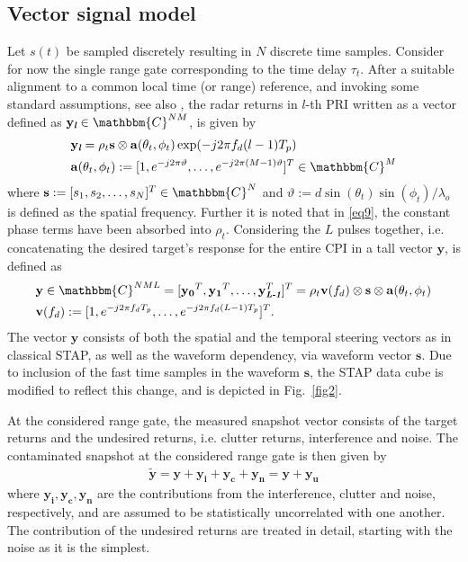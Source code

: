 \documentclass[11pt,draftclsnofoot,onecolumn]{IEEEtran}
\def\mathbi#1{\textbf{\em #1}}
\theoremstyle{definition}
\theoremstyle{remark}
\begin{document}
\subsection{Vector signal model}
Let $s(t)$ be sampled discretely resulting in $N$ discrete time samples. Consider for now the single range gate corresponding to the time delay $\tau_t$. After a suitable alignment to a common local time (or range) reference,  and invoking some standard assumptions, see also \cite[{\it A.1-A.3}] {Setlurradar2013}, the radar returns in $l$-th PRI  written as a vector defined as $\mathbf{y}_{\mathbi{l}}\in\mathbbm{C}^{NM}$, is given by
\begin{align}
&\mathbf{y}_{\mathbi{l}}=\rho_t\mathbf{s}\otimes \mathbf{a}(\theta_t,\phi_t)\exp(-j2\pi f_d(l-1)T_p) \label{eq9} \\
&\mathbf{a}(\theta_t,\phi_t):=[1,e^{-j2\pi\vartheta},\ldots,e^{-j2\pi (M-1)\vartheta}]^T \in\mathbbm{C}^M \nonumber
\end{align}
where $\mathbf{s}:=[s_1,s_2,\ldots,s_N]^T \in\mathbbm{C}^N  $ and $\vartheta:=d\sin(\theta_t)\sin(\phi_t)/\lambda_o$ is defined as the spatial frequency. Further it is noted that in \eqref{eq9}, the constant phase terms have been absorbed into $\rho_t$. Considering the $L$ pulses together, i.e. concatenating the desired target's response for the entire CPI in a tall vector $\mathbf{y}$, is defined as
\begin{align}
&\mathbf{y}\in\mathbbm{C}^{NML}=[\mathbf{y_0}^T,\mathbf{y_1}^T,\ldots,\mathbf{y}_{\mathbi{L-1}}^T]^T =\rho_t \mathbf{v}(f_d) \otimes\mathbf{s}\otimes \mathbf{a}(\theta_t,\phi_t)\nonumber \\
&\mathbf{v}(f_d):=[1,e^{-j2\pi f_dT_p},\ldots,e^{-j2\pi f_d(L-1)T_p}]^T \label{eq10}.
\end{align}
The vector $\mathbf{y}$ consists of both the spatial and the temporal steering vectors as in classical STAP, as well as the waveform dependency, via waveform vector $\mathbf{s}$. Due to inclusion of the fast time samples in the waveform $\mathbf{s}$, the STAP data cube is modified to reflect this change, and is depicted in Fig.~\ref{fig2}.

At the considered range gate, the measured snapshot vector consists of the target returns and the undesired returns, i.e. clutter returns, interference and noise. The contaminated snapshot at the considered range gate is then given by
\begin{align}
\mathbf{\tilde{y}}=\mathbf{y}+\mathbf{y_i}+\mathbf{y_c}+\mathbf{y_n} 
                =\mathbf{y}+\mathbf{y_{u}} \label{eq.11} 
\end{align}
where $\mathbf{y_i,y_c,y_n}$ are the contributions from the interference, clutter and noise, respectively, and are assumed to be statistically uncorrelated with one another. The contribution of the undesired returns are treated in detail, starting with the noise as it is the simplest.
\end{document}
